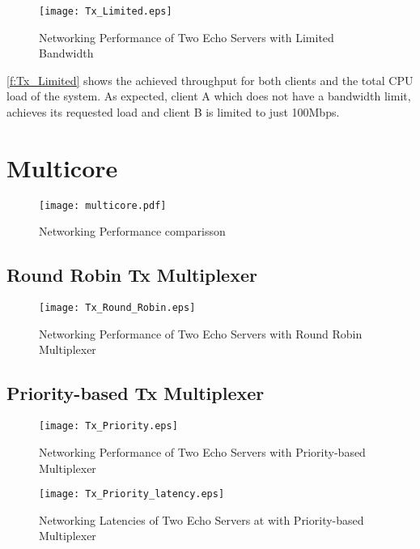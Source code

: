 \begin{figure}[h]
    \centering
    \texttt{[image: Tx\_Limited.eps]}
    \caption{Networking Performance of Two Echo Servers with Limited Bandwidth}
    \label{f:Tx_Limited}
\end{figure}

\autoref{f:Tx_Limited} shows the achieved throughput for both clients and the total CPU load of the system. As expected, client A which
does not have a bandwidth limit, achieves its requested load and client B is limited to just 100Mbps. 

\section{Multicore}

\begin{figure}[h]
    \centering
    \texttt{[image: multicore.pdf]}
    \caption{Networking Performance comparisson}
    \label{f:multicore}
\end{figure}



\subsection{Round Robin Tx Multiplexer}

\begin{figure}[h]
    \centering
    \texttt{[image: Tx\_Round\_Robin.eps]}
    \caption{Networking Performance of Two Echo Servers with Round Robin Multiplexer}
    \label{f:round_robin_mux}
\end{figure}

\subsection{Priority-based Tx Multiplexer}

\begin{figure}[h]
    \centering
    \texttt{[image: Tx\_Priority.eps]}
    \caption{Networking Performance of Two Echo Servers with Priority-based Multiplexer}
    \label{f:priority_mux}
\end{figure}

\begin{figure}[h]
    \centering
    \texttt{[image: Tx\_Priority\_latency.eps]}
    \caption{Networking Latencies of Two Echo Servers at with Priority-based Multiplexer}
    \label{f:priority_latency}
\end{figure}

